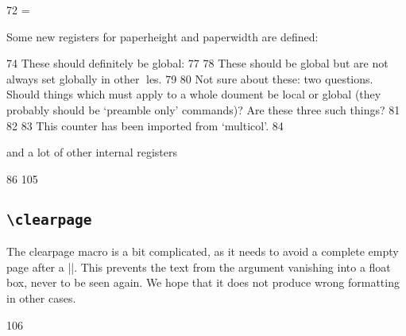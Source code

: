 \begin{teXXX}
72 \newdimen{} \@maxdepth = \maxdepth
\end{teXXX}


Some new registers for paperheight and paperwidth are defined:

\begin{teXXX}
74 \newdimen{} \newdimen{} \newif \if@insert
These should definitely be global:
77 \newif \if@fcolmade
78 \newif \if@specialpage \@specialpagefalse
These should be global but are not always set globally in other les.
79 \newif \if@firstcolumn \@firstcolumntrue
80 \newif \if@twocolumn \@twocolumnfalse
Not sure about these: two questions. Should things which must apply to a whole
doument be local or global (they probably should be `preamble only' commands)?
Are these three such things?
81 \newif \if@twoside \@twosidefalse
82 \newif \if@reversemargin \@reversemarginfalse
83 \newif \if@mparswitch \@mparswitchfalse
This counter has been imported from `multicol'.
84 \newcount {} \col@number \@ne
\end{teXXX}

and a lot of other internal registers

\begin{teX}
86 \newcount{} \newdimen{} \newcount{} \newdimen{} \newcount{} \newdimen{} \newcount{} \newdimen{} \newdimen{} \newdimen{} \newdimen{} \newdimen{} \newdimen{} \newdimen\@mparbottom \@mparbottom{} \newcount{} \newbox{} \newbox{} \newbox{} \def\@thehead{\@oddhead} %
105 \def\@thefoot{\@oddfoot}
\end{teX}


\subsection{\texttt{\textbackslash clearpage}}

\begin{macro}{\clearpage}
The clearpage macro is a bit complicated, as it needs to avoid a complete empty page after a |\twocolumn[..]|. This prevents the text from the argument
vanishing into a  float box, never to be seen again. We hope that it does not
produce wrong formatting in other cases.
\end{macro}

\begin{teXXX}
106 \def\clearpage{%
107   \ifvmode
108   \ifnum \@dbltopnum =\m@ne
109     \ifdim \pagetotal <\topskip
110       \hbox{}%
111     \fi
112   \fi
113  \fi
114 \newpage
115 \write\m@ne{}%
116 \vbox{}%
117 \penalty -\@Mi
118 }
\end{teXXX}

